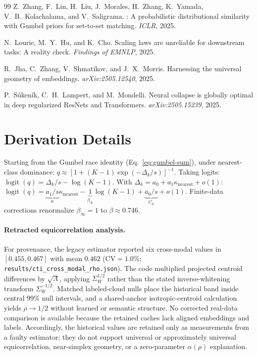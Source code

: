 \documentclass{article}
\DeclareMathOperator{\logit}{logit}
\begin{document}
\begin{thebibliography}{99}
Z.~Zhang, F.~Lin, H.~Liu, J.~Morales, H.~Zhang, K.~Yamada, V.~B.~Kolachalama, and V.~Saligrama.
: A probabilistic distributional similarity with {G}umbel priors for set-to-set matching.
\newblock \emph{ICLR}, 2025.

N.~Lourie, M.~Y.~Hu, and K.~Cho.
\newblock Scaling laws are unreliable for downstream tasks: A reality check.
\newblock \emph{Findings of EMNLP}, 2025.

R.~Jha, C.~Zhang, V.~Shmatikov, and J.~X.~Morris.
\newblock Harnessing the universal geometry of embeddings.
\newblock \emph{arXiv:2505.12540}, 2025.

P.~S\'{u}ken\'{i}k, C.~H.~Lampert, and M.~Mondelli.
\newblock Neural collapse is globally optimal in deep regularized {ResNets} and {Transformers}.
\newblock \emph{arXiv:2505.15239}, 2025.

\end{thebibliography}

\appendix

\section{Derivation Details}
\label{app:derivation}
Starting from the Gumbel race identity (Eq.~\ref{eq:gumbel-sum}), under nearest-class dominance:
$q\approx[1+(K-1)\exp(-\Delta_k/s)]^{-1}$.
Taking logits: $\logit(q)=\Delta_k/s-\log(K-1)$.
With $\Delta_k=a_0+a_1\kappa_{\mathrm{nearest}}+o(1)$:
$\logit(q)=\underbrace{a_1/s}_{\alpha}\kappa_{\mathrm{nearest}}
-\underbrace{1}_{\beta_\infty}\log(K-1)
+\underbrace{a_0/s}_{C_0}+o(1)$.
Finite-data corrections renormalize $\beta_\infty=1$ to $\beta\approx0.746$.

\paragraph{Retracted equicorrelation analysis.}
\label{app:equicorr-retraction}
For provenance, the legacy estimator reported six cross-modal values in $[0.455,0.467]$ with mean $0.462$ (CV$=1.0\%$; \texttt{results/cti\_cross\_modal\_rho.json}).
The code multiplied projected centroid differences by $\sqrt{\Lambda}$, applying $\Sigma_W^{1/2}$ rather than the stated inverse-whitening transform $\Sigma_W^{-1/2}$.
Matched labeled-cloud nulls place the historical band inside central 99\% null intervals, and a shared-anchor isotropic-centroid calculation yields $\rho\to1/2$ without learned or semantic structure.
No corrected real-data comparison is available because the retained caches lack aligned embeddings and labels.
Accordingly, the historical values are retained only as measurements from a faulty estimator; they do not support universal or approximately universal equicorrelation, near-simplex geometry, or a zero-parameter $\alpha(\rho)$ explanation.
\end{document}
